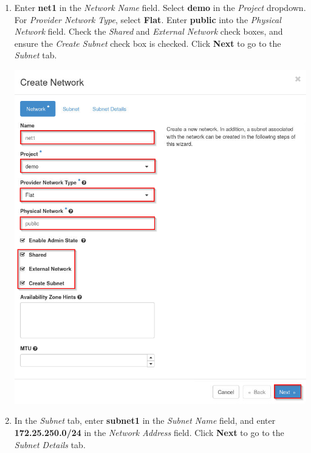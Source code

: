 \documentclass[letterpaper, 12pt]{article}
\begin{document}
\begin{enumerate}
    \item Enter \textbf{net1} in the \textit{Network Name} field. Select \textbf{demo} in the \textit{Project} dropdown.
    For \textit{Provider Network Type}, select \textbf{Flat}. Enter \textbf{public} into the \textit{Physical Network}
    field. Check the \textit{Shared} and \textit{External Network} check boxes, and ensure the \textit{Create Subnet}
    check box is checked. Click \textbf{Next} to go to the \textit{Subnet} tab.

    \begin{center}
        \includegraphics[width=\linewidth]{images/part1/step5.png}
    \end{center}

    \item In the \textit{Subnet} tab, enter \textbf{subnet1} in the \textit{Subnet Name} field, and enter
    \textbf{172.25.250.0/24} in the \textit{Network Address} field. Click \textbf{Next} to go to the \textit{Subnet
    Details} tab.


\end{enumerate}
\end{document}
